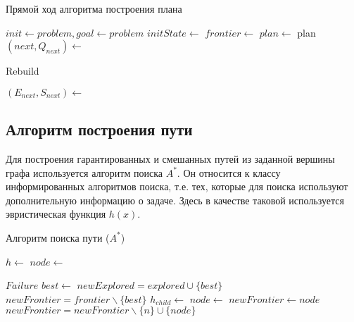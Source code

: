 \begin{algorithm}
 \caption{Прямой ход алгоритма построения плана}
 \begin{algorithmic}
    \State $init \gets problem, goal \gets problem$
    \State $initState \gets$ 
    \State $frontier \gets $ 
    \State $plan \gets $ 
    \State \Return {}
  \EndFunction
      \State \Return plan
    \Else
      \State $(next, Q_{next}) \gets $ 
      
	\State \Return Rebuild
      \EndIf
      
      \State $(E_{next}, S_{next}) \gets $ 
      \State \Return {}
    \EndIf
  \EndFunction
 \end{algorithmic}
\end{algorithm}


\subsection{Алгоритм построения пути}

Для построения гарантированных и смешанных путей из заданной вершины графа используется алгоритм поиска $A^*$. Он относится к классу информированных алгоритмов поиска, т.е. тех, которые для поиска используют дополнительную информацию о задаче. Здесь в качестве таковой используется эвристическая функция $h(x)$.

\begin{algorithm}
 \caption{Алгоритм поиска пути ($A^*$)}
 \begin{algorithmic}
    \State $h \gets$ 
    \State $node \gets$ 
    \State \Return {}    
  \EndFunction
  
      \State \Return $Failure$
    \Else
      \State $best \gets $ 
	\State \Return {}
      \Else
	\State $newExplored = explored \cup \{best\}$
	\State $newFrontier = frontier \backslash \{best\}$
	  \State $h_{child} \gets $
	  \State $node \gets $
	    \State $newFrontier \gets node$ 
	    \State $newFrontier = newFrontier \backslash \{n\} \cup \{node\}$
	  \EndIf
	\EndFor
	\State {}
      \EndIf
    \EndIf
  \EndFunction
 \end{algorithmic}
\end{algorithm}

